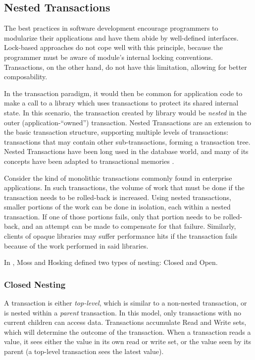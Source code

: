 \documentclass{llncs}
\begin{document}
\subsection{Nested Transactions}

The best practices in software development encourage programmers to
modularize their applications and have them abide by well-defined
interfaces. Lock-based approaches do not cope well with this
principle, because the programmer must be aware of module's internal
locking conventions. Transactions, on the other hand, do not have this
limitation, allowing for better composability.

In the transaction paradigm, it would then be common for application
code to make a call to a library which uses transactions to protect
its shared internal state. In this scenario, the transaction created
by library would be {\it nested} in the outer (application-``owned'')
transaction. Nested Transactions are an extension to the basic
transaction structure, supporting multiple levels of transactions:
transactions that may contain other sub-transactions, forming a
transaction tree. Nested Transactions have been long used in the
database world, and many of its concepts have been adapted to
transactional memories \cite{worah1997transactions}.

Consider the kind of monolithic transactions commonly found in
enterprise applications. In such transactions, the volume of work that
must be done if the transaction needs to be rolled-back is
increased. Using nested transactions, smaller portions of the work can
be done in isolation, each within a nested transaction. If one of
those portions fails, only that portion needs to be rolled-back, and
an attempt can be made to compensate for that failure. Similarly,
clients of opaque libraries may suffer performance hits if the
transaction fails because of the work performed in said libraries.

In \cite{moss2006nested}, Moss and Hosking defined two types of
nesting: Closed and Open.

\subsubsection{Closed Nesting}

A transaction is either {\it top-level}, which is similar to a
non-nested transaction, or is nested within a {\it parent}
transaction. In this model, only transactions with no current children
can access data. Transactions accumulate Read and Write sets, which
will determine the outcome of the transaction. When a transaction
reads a value, it sees either the value in its own read or write set,
or the value seen by its parent (a top-level transaction sees the
latest value).
\end{document}
